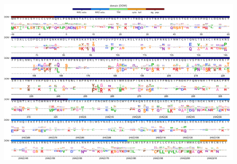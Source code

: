 \documentclass[9pt,twocolumn,twoside]{pnas-new}
\begin{document}
\begin{suppfigure}[H]
\centerline{\includegraphics[width=0.9\textwidth]{figs/supp_diffprefs/diffprefs.pdf}}
\caption{\label{suppfig:diffprefs_logoplot}
{\bf The differential preferences of the Perth/2009 H3 HA compared to amino-acid frequencies from a sequence alignment of natural human H3.}
The differential preferences estimated by comparing the Perth/2009 H3 HA preferences to amino-acid frequencies from a sequence alignment of natural human H3N2 HA sequences.
For each site, the height of each letter above and below the line indicate how differentially preferred that amino acid is in our experiments compared to in nature.
The overlays show the same information as in Figure~\ref{fig:logoplot} (domain and wildtype amino acid).
The sites are in H3 numbering.
}
\end{suppfigure}
\end{document}
